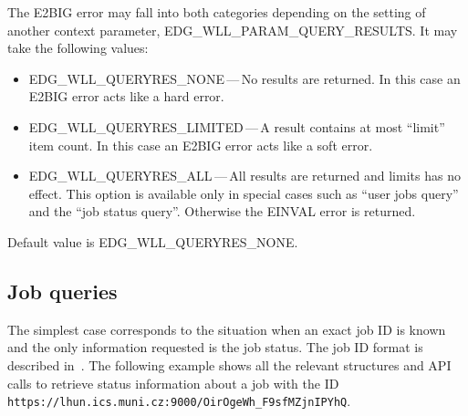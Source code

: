 The E2BIG error may fall into both categories depending on the setting of
another context parameter, EDG\_WLL\_PARAM\_QUERY\_RESULTS.
It may take the following values:

\begin{itemize}
	\item{EDG\_WLL\_QUERYRES\_NONE}\,---\,No results are returned.
	In this case an E2BIG error acts like a hard error.
	\item{EDG\_WLL\_QUERYRES\_LIMITED}\,---\,A result contains at most ``limit'' item count.
	In this case an E2BIG error acts like a soft error.
	\item{EDG\_WLL\_QUERYRES\_ALL}\,---\,All results are returned and limits has no effect.
	This option is available only in special cases such as ``user jobs query'' and 
	the ``job status query''. Otherwise the EINVAL error is returned.
\end{itemize}
Default value is EDG\_WLL\_QUERYRES\_NONE.


\subsection{Job queries}

\label{JS}


The simplest case corresponds to the situation when an exact job ID
is known and the only information requested is the job status. The job ID
format is described in~\cite{djra1.4}.
The following example shows 
all the relevant structures and API calls to retrieve status information
about a job with the ID\\
\texttt{https://lhun.ics.muni.cz:9000/OirOgeWh\_F9sfMZjnIPYhQ}.



%

